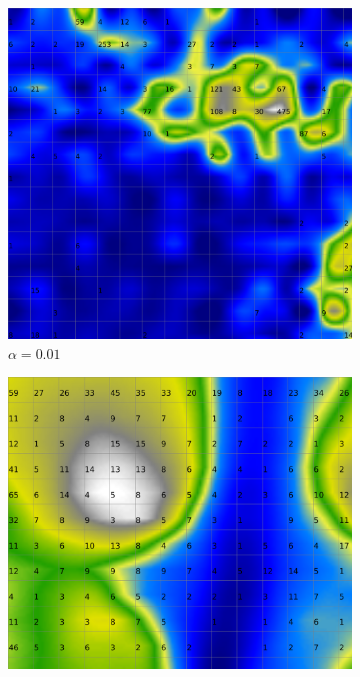 \documentclass{acm_proc_article-sp}
\begin{document}
\begin{figure}
\centering
    \centering
    \begin{subfigure}[b]{0.24\linewidth}
        \includegraphics[width=\linewidth]{img/wine-20x16-smoothed-data-histogram-alpha-0.01-f-50}
        \caption{$\alpha=0.01$}
        \label{fig:wine-20x16-smoothed-data-histogram-alpha-0.01-f-50}
    \end{subfigure}
    \begin{subfigure}[b]{0.24\linewidth}
        \includegraphics[width=\linewidth]{img/wine-20x16-smoothed-data-histogram-alpha-0.45-f-50}

\end{subfigure}
\end{figure}
\end{document}
